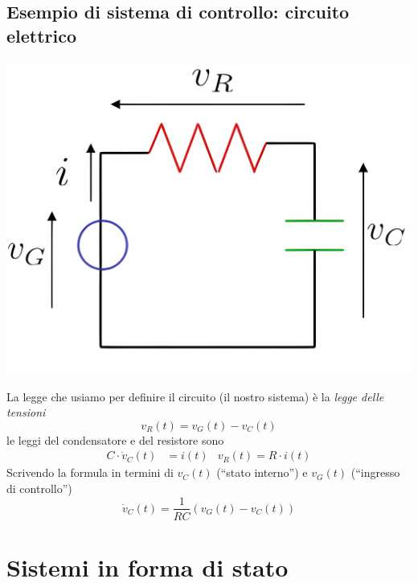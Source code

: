 \documentclass{article}
\begin{document}
\subsection{Esempio di sistema di controllo: circuito elettrico} \label{Circuito elettrico}
\begin{center}
    \includegraphics[scale=0.2]{Images/Es_cirucito_elettrico.png}
\end{center}
La legge che usiamo per definire il circuito (il nostro sistema) è la \textit{legge delle tensioni}
\[
    v_R (t) = v_G (t) - v_C(t)
\] 
le leggi del condensatore e del resistore sono 
\begin{align*}
    C \cdot  \dot v_C (t) &= i(t) & v_R (t) = R\cdot i(t)
\end{align*}
Scrivendo la formula in termini di $v_C (t)$ (“stato interno”) e $v_G (t)$ (“ingresso di controllo”)
\[
    \dot v_C (t) = \frac{1}{RC} \left(v_G (t) - v_C (t) \right)
\]




\section{Sistemi in forma di stato}
\end{document}
